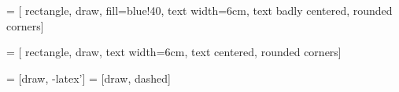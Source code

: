\usepackage{tikz}
\usetikzlibrary{
	shapes,
    arrows,
    shapes.geometric,
    positioning,
}

 = [
	rectangle,
    draw,
    fill=blue!40,
    text width=6cm,
    text badly centered,
    rounded corners]

 = [
	rectangle,
	draw,
    text width=6cm,
    text centered,
    rounded corners]

 = [draw, -latex']
 = [draw, dashed]

